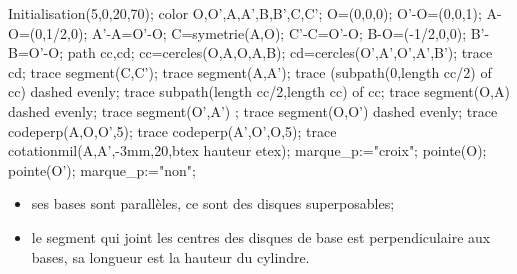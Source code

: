 \begin{definition}[Le cylindre]
   \begin{minipage}{0.25\linewidth}
      \begin{Geometrie}[CoinBG={u*(-10,-10)},CoinHD={u*(10,10)},TypeTrace="Espace"]
         Initialisation(5,0,20,70);
         color O,O',A,A',B,B',C,C';
         O=(0,0,0);
         O'-O=(0,0,1);
         A-O=(0,1/2,0);
         A'-A=O'-O;
         C=symetrie(A,O);
         C'-C=O'-O;
         B-O=(-1/2,0,0);
         B'-B=O'-O;
         path cc,cd;
         cc=cercles(O,A,O,A,B);
         cd=cercles(O',A',O',A',B');
         trace cd;
         trace segment(C,C');
         trace segment(A,A');
         trace (subpath(0,length cc/2) of cc) dashed evenly;
         trace subpath(length cc/2,length cc) of cc;
         trace segment(O,A) dashed evenly;
         trace segment(O',A') ;
         trace segment(O,O') dashed evenly;
         trace codeperp(A,O,O',5);
         trace codeperp(A',O',O,5);
         trace cotationmil(A,A',-3mm,20,btex hauteur etex);
         marque_p:="croix";
         pointe(O);
         pointe(O');
         marque_p:="non";
      \end{Geometrie}  
   \end{minipage}
   \hfill
   \begin{minipage}{0.7\linewidth}
      \begin{itemize}
         \item  ses bases sont parallèles, ce sont des disques superposables;
         \item  le segment qui joint les centres des disques de base est perpendiculaire aux bases, sa longueur est la hauteur du cylindre.
      \end{itemize}
   \end{minipage}
\end{definition}